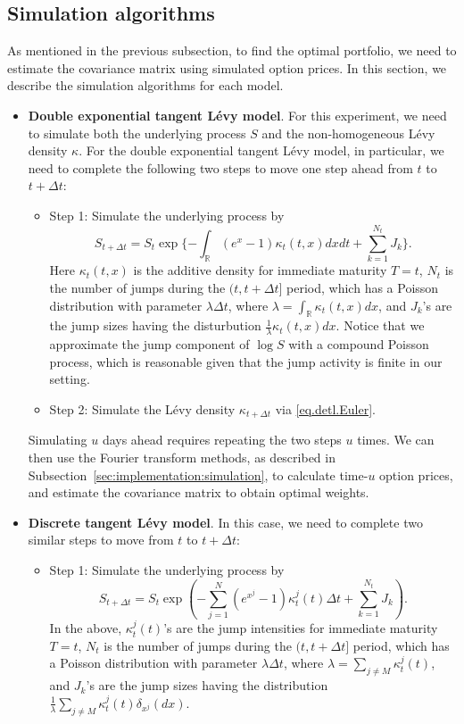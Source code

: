 \documentclass{article}
\numberwithin{equation}{section}
\newcommand\RR {\mathbb R}
\begin{document}
\subsection{Simulation algorithms}\label{sec:compare:algo}
As mentioned in the previous subsection, to find the optimal portfolio, we need to estimate the covariance matrix using simulated option prices. In this section, we describe the simulation algorithms for each model. 
\begin{itemize}
\item {\bf Double exponential tangent L\'{e}vy model}.
For this experiment, we need to simulate both the underlying process $S$ and the non-homogeneous L\'evy density $\kappa$. For the double exponential tangent L\'{e}vy model, in particular, we need to complete the following two steps to move one step ahead from $t$ to $t+\Delta t$: 
\begin{itemize}
\item Step 1: Simulate the underlying process by
\begin{equation*}
S_{t+\Delta t} = S_t \exp\{ -\int_{\RR}(e^x-1)\kappa_t(t,x)dxdt + \sum_{k=1}^{N_t} J_k\}.
\end{equation*}  
Here $\kappa_t(t,x)$ is the additive density for immediate maturity $T=t$, $N_t$ is the number of jumps during the $(t,t+\Delta t]$ period, which has a Poisson distribution with parameter $\lambda \Delta t$, where $\lambda = \int_{\RR} \kappa_t(t,x) dx$, and $J_k$'s are the jump sizes having the disturbution $\frac{1}{\lambda}\kappa_t(t,x)dx$. Notice that we approximate the jump component of $\log S$ with a compound Poisson process, which is reasonable given that the jump activity is finite in our setting.   

\item Step 2: Simulate the L\'evy density $\kappa_{t+\Delta t}$ via \eqref{eq.detl.Euler}.
\end{itemize}
Simulating $u$ days ahead requires repeating the two steps $u$ times. We can then use the Fourier transform methods, as described in Subsection~\ref{sec:implementation:simulation}, to calculate time-$u$ option prices, and estimate the covariance matrix to obtain optimal weights. 

\item {\bf Discrete tangent L\'{e}vy model}. 
In this case, we need to complete two similar steps to move from $t$ to $t+\Delta t$: 
\begin{itemize}
\item Step 1: Simulate the underlying process by
\begin{equation*}
S_{t+\Delta t} = S_t \exp\left( -\sum_{j=1}^N (e^{x^j}-1)\kappa_t^j(t)\Delta t + \sum_{k=1}^{N_t} J_k\right).
\end{equation*}  
In the above, $\kappa_t^j(t)$'s are the jump intensities for immediate maturity $T=t$, $N_t$ is the number of jumps during the $(t,t+\Delta t]$ period, which has a Poisson distribution with parameter $\lambda \Delta t$, where $\lambda = \sum_{j\neq M} \kappa_t^j(t)$, and $J_k$'s are the jump sizes having the distribution $\frac{1}{\lambda}\sum_{j\neq M} \kappa_t^j(t) \delta_{x^j}(dx)$. 


\end{itemize}
\end{itemize}
\end{document}
